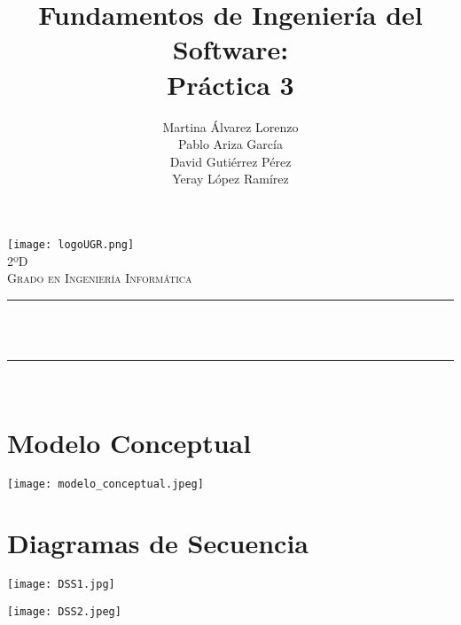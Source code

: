 \documentclass[12pt, spanish]{article}
\title{Fundamentos de Ingeniería del Software:\\
Práctica 3  \hspace{0.05cm} }
\date{}
\author{
\begin{center}
Martina Álvarez Lorenzo  \\
Pablo Ariza García  \\
David Gutiérrez Pérez  \\
Yeray López Ramírez \\
\end{center}
}
\makeatletter
\let\thetitle\@title
\let\theauthor\@author
\makeatother
\begin{document}

\begin{titlepage}
  \centering
  \vspace*{0.5 cm}
  \texttt{[image: logoUGR.png]}\\[1.0 cm]
  \textsc{\large 2ºD}\\[0.5 cm]
  \textsc{\large Grado en Ingeniería Informática}\\[0.5 cm]              
  \rule{\linewidth}{0.2 mm} \\[0.4 cm]
  { \huge \bfseries \thetitle}\\
  \rule{\linewidth}{0.2 mm} \\[1.5 cm]
  
      
  \theauthor

  \vfill
  
\end{titlepage}

\newpage



\tableofcontents
\pagebreak

\section{Modelo Conceptual}

\begin{centering}\texttt{[image: modelo\_conceptual.jpeg]}\\[1.0 cm]\end{centering}


\section{Diagramas de Secuencia}

\begin{centering}\texttt{[image: DSS1.jpg]}\\[1.0 cm]\end{centering}

\begin{centering}\texttt{[image: DSS2.jpeg]}\\[1.0 cm]\end{centering}
\end{document}

